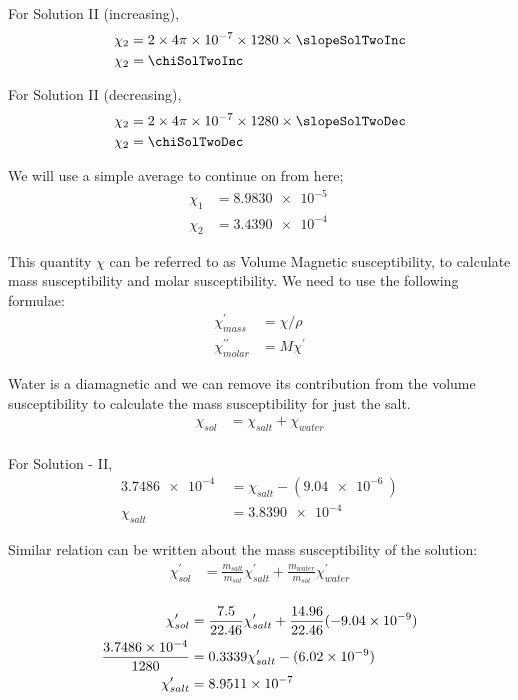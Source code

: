 \documentclass[../main.tex]{subfiles}
\begin{document}
For Solution II (increasing),
\begin{align*}
	\chi_2 &= 2 \times 4 \pi \times \SI{e-7}{} \times 1280 \times \slopeSolTwoInc \\
	\chi_2 &= \chiSolTwoInc
\end{align*}

For Solution II (decreasing),
\begin{align*}
	\chi_2 &= 2 \times 4 \pi \times \SI{e-7}{} \times 1280 \times \slopeSolTwoDec \\
	\chi_2 &= \chiSolTwoDec
\end{align*}

We will use a simple average to continue on from here;
\begin{align*}
	\chi_1 &= \SI{8.9830e-5}{} \\
	\chi_2 &= \SI{3.4390e-4}{} 
\end{align*}

This quantity $\chi$ can be referred to as Volume Magnetic susceptibility, to calculate mass susceptibility and molar susceptibility. We need to use the following formulae:
\begin{align*}
	\chi^{\prime}_{mass} &= \chi/\rho \\
\chi^{\prime\prime}_{molar} &= M\chi^{\prime}
\end{align*}

Water is a diamagnetic and we can remove its contribution from the volume susceptibility to calculate the mass susceptibility for just the salt. 
\begin{align*}
	\chi_{sol} &= \chi_{salt} + \chi_{water} \\ 
\end{align*}

For Solution - II,
\begin{align*}
	\SI{3.7486e-4}{} &= \chi_{salt} - (\SI{9.04e-6}{}) \\ 
	\chi_{salt} &= \SI{3.8390e-4}{}
\end{align*}

Similar relation can be written about the mass susceptibility of the solution:
\begin{align*}
	\chi^{\prime}_{sol} &= \frac{m_{salt}}{m_{sol}}\chi^{\prime}_{salt} + \frac{m_{water}}{m_{sol}}\chi^{\prime}_{water} \\ 
\end{align*}

\begin{align*}
	\chi^{\prime}_{sol} &= \frac{7.5}{22.46}\chi^{\prime}_{salt} + \frac{14.96}{22.46}(\SI{- 9.04e-9}{}) \\
	\frac{\SI{3.7486e-4}{}}{1280} &= 0.3339\chi^{\prime}_{salt} - (\SI{6.02e-9}{}) \\ 
	\chi^{\prime}_{salt} &=  \SI{8.9511e-7}{}
\end{align*}
\end{document}
